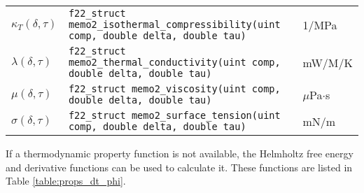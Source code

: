 \documentclass[oneside]{book}
\begin{document}
\begin{table}[h!]
\begin{tabular}{ l l l }
$\kappa_T(\delta, \tau)$ & \texttt{f22\_struct memo2\_isothermal\_compressibility(uint comp, double delta, double tau)} &  1/MPa \\ [1ex]
$\lambda(\delta, \tau)$ & \texttt{f22\_struct memo2\_thermal\_conductivity(uint comp, double delta, double tau)} &  mW/M/K \\ [1ex]
$\mu(\delta, \tau)$ & \texttt{f22\_struct memo2\_viscosity(uint comp, double delta, double tau)} &  $\mu$Pa$\cdot$s \\ [1ex]
$\sigma(\delta, \tau)$ & \texttt{f22\_struct memo2\_surface\_tension(uint comp, double delta, double tau)} &  mN/m \\ [1ex]
 \hline    
\end{tabular}
\label{table:props_dt}
\end{table}

If a thermodynamic property function is not available, the Helmholtz free energy and derivative functions can be used to calculate it.  These functions are listed in Table \ref{table:props_dt_phi}.
\end{document}
